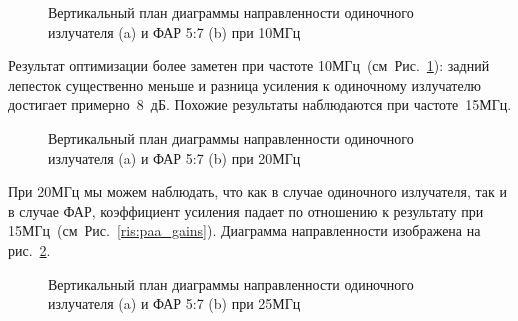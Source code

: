 \begin{figure}
\begin{minipage}[h]{0.49\linewidth}
\end{minipage}
\hfill
\begin{minipage}[h]{0.49\linewidth}
\end{minipage}
\caption{Вертикальный план диаграммы направленности одиночного излучателя (a) и ФАР 5:7 (b) при 10МГц}
\label{ris:10MHz}
\end{figure}

Результат оптимизации более заметен при частоте 10МГц~(см~Рис.~\ref{ris:10MHz}): задний лепесток существенно меньше и разница усиления к одиночному излучателю достигает примерно~8~дБ. Похожие результаты наблюдаются при частоте~15МГц.

\begin{figure}
\begin{minipage}[h]{0.49\linewidth}
\end{minipage}
\hfill
\begin{minipage}[h]{0.49\linewidth}
\end{minipage}
\caption{Вертикальный план диаграммы направленности одиночного излучателя (a) и ФАР 5:7 (b) при 20МГц}
\label{ris:f20mhs}
\end{figure}

При 20МГц мы можем наблюдать, что как в случае одиночного излучателя, так и в случае ФАР, коэффициент усиления падает по отношению к результату при 15МГц~(см~Рис.~\ref{ris:paa_gains}). Диаграмма направленности изображена на рис.~\ref{ris:f20mhs}.

\begin{figure}
\begin{minipage}[h]{0.49\linewidth}
\end{minipage}
\hfill
\begin{minipage}[h]{0.49\linewidth}
\end{minipage}
\caption{Вертикальный план диаграммы направленности одиночного излучателя (a) и ФАР 5:7 (b) при 25МГц}
\label{ris:f25mhs}
\end{figure}

